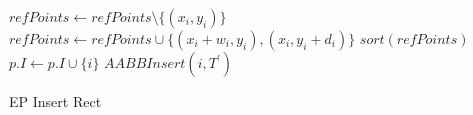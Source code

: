 \begin{algorithm}[htb] 
    \DontPrintSemicolon
    \SetAlgoLined
    $refPoints \gets refPoints \setminus \{ (x_i, y_i) \}$\;
    $refPoints \gets refPoints \cup \{(x_i + w_i, y_i), (x_i, y_i + d_i)\}$\;
    $sort(refPoints)$ \;
    $p.I \gets p.I \cup \{ i \}$\;
    $AABBInsert(i, T^\prime)$ \;
    \Return
    \caption{EP Insert Rect \label{algo:ep_insert_rect}}
\end{algorithm}